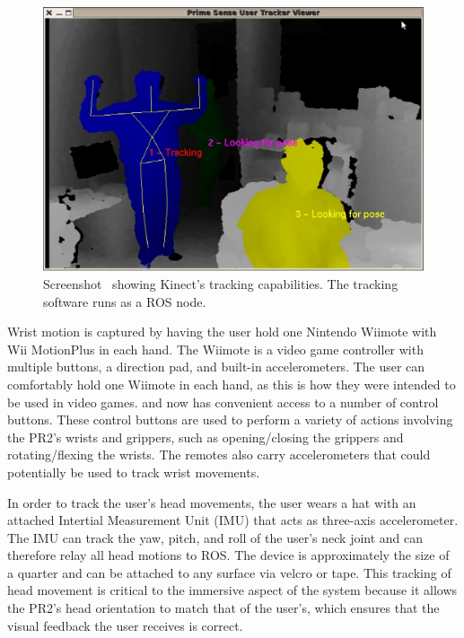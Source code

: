 \documentclass{sig-alternate}
\begin{document}
\begin{figure}[htb] 
	\begin{center}
		\includegraphics[width=0.8\linewidth]{kinect}
	\end{center}
	\caption{Screenshot~\cite{kinect_pic} showing Kinect's tracking capabilities. The tracking software runs as a ROS node.}
	\label{fig:kinect_screenshot}
\end{figure}

\indent Wrist motion is captured by having the user hold one Nintendo Wiimote with 
Wii MotionPlus in each hand. The Wiimote is a video game controller with 
multiple buttons, a direction pad, and built-in accelerometers. 
The user can comfortably hold one Wiimote in each hand,
as this is how they were intended to be used in video games. and now has
convenient access to a number of
control buttons. These control buttons are used to perform a variety of actions
involving the PR2's wrists and grippers, such as opening/closing the grippers and
rotating/flexing the wrists. The remotes also carry accelerometers that could potentially be used
to track wrist movements. 

\indent In order to track the user's head movements, the user wears a hat
with an attached Intertial Measurement Unit (IMU) that acts as three-axis accelerometer. The IMU can track the yaw, pitch, and roll of the user's neck joint and can therefore relay all head motions to ROS. The device is
approximately the size of a quarter and can be attached to any surface via velcro or tape. This tracking of head movement is critical to the immersive aspect of the system
because it allows the PR2's head orientation to match that of the user's, which ensures that the visual feedback the user receives is correct.
\end{document}
